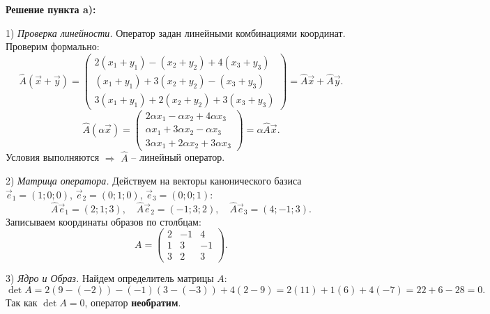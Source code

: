 \documentclass[12pt,a4paper]{article}
\theoremstyle{plain}
\theoremstyle{definition}
\begin{document}
\begin{solbox}
    \textbf{Решение пункта a):}
    
    1) \textit{Проверка линейности.}
    Оператор задан линейными комбинациями координат. Проверим формально:
    \[
    \hat{A}(\vec{x}+\vec{y}) = \begin{pmatrix} 2(x_1+y_1) - (x_2+y_2) + 4(x_3+y_3) \\ (x_1+y_1) + 3(x_2+y_2) - (x_3+y_3) \\ 3(x_1+y_1) + 2(x_2+y_2) + 3(x_3+y_3) \end{pmatrix} = \hat{A}\vec{x} + \hat{A}\vec{y}.
    \]
    \[
    \hat{A}(\alpha\vec{x}) = \begin{pmatrix} 2\alpha x_1 - \alpha x_2 + 4\alpha x_3 \\ \alpha x_1 + 3\alpha x_2 - \alpha x_3 \\ 3\alpha x_1 + 2\alpha x_2 + 3\alpha x_3 \end{pmatrix} = \alpha \hat{A}\vec{x}.
    \]
    Условия выполняются $\Rightarrow$ $\hat{A}$ -- линейный оператор.

    2) \textit{Матрица оператора.}
    Действуем на векторы канонического базиса $\vec{e}_1=(1;0;0)$, $\vec{e}_2=(0;1;0)$, $\vec{e}_3=(0;0;1)$:
    \[
    \hat{A}\vec{e}_1 = (2; 1; 3), \quad \hat{A}\vec{e}_2 = (-1; 3; 2), \quad \hat{A}\vec{e}_3 = (4; -1; 3).
    \]
    Записываем координаты образов по столбцам:
    \[
    A = \begin{pmatrix} 2 & -1 & 4 \\ 1 & 3 & -1 \\ 3 & 2 & 3 \end{pmatrix}.
    \]

    3) \textit{Ядро и Образ.}
    Найдем определитель матрицы $A$:
    \[
    \det A = 2(9 - (-2)) - (-1)(3 - (-3)) + 4(2 - 9) = 2(11) + 1(6) + 4(-7) = 22 + 6 - 28 = 0.
    \]
    Так как $\det A = 0$, оператор \textbf{необратим}.
    

\end{solbox}
\end{document}
